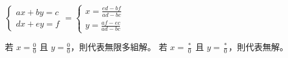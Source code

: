 $\begin{cases}ax+by=c\\dx+ey=f\end{cases} = \begin{cases}x = \frac{ed-bf}{ad-bc}\\y = \frac{af-ec}{ad-bc}\end{cases}$

若 $x = \frac{0}{0}$ 且 $y = \frac{0}{0}$，則代表無限多組解。
若 $x = \frac{*}{0}$ 且 $y = \frac{*}{0}$，則代表無解。
